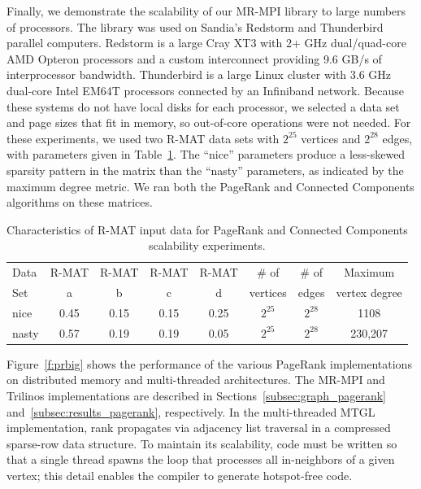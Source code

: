 Finally, we demonstrate the scalability of our MR-MPI library to large
numbers of processors.  The library was used on Sandia's Redstorm and
Thunderbird parallel computers.  Redstorm is a large Cray XT3 with 2+
{GHz} dual/quad-core AMD Opteron processors and a custom interconnect
providing 9.6 GB/s of interprocessor bandwidth.  Thunderbird is a
large Linux cluster with 3.6 {GHz} dual-core Intel EM64T processors
connected by an Infiniband network.  Because these systems do not have
local disks for each processor, we selected a data set and page sizes
that fit in memory, so out-of-core operations were not needed.  For
these experiments, we used two R-MAT data sets with $2^{25}$ vertices
and $2^{28}$ edges, with parameters given in Table~\ref{t:rmat}.  The
``nice'' parameters produce a less-skewed sparsity pattern in the
matrix than the ``nasty'' parameters, as indicated by the maximum
degree metric.  We ran both the PageRank and Connected Components
algorithms on these matrices.

\begin{table}
\begin{center}
\begin{tabular}{|l|c|c|c|c|c|c|c|}
\hline
Data & R-MAT  & R-MAT  & R-MAT  & R-MAT  & \# of    & \# of & Maximum \\
Set  & a      & b      & c      & d      & vertices & edges & vertex degree\\
\hline
nice  & 0.45 & 0.15 & 0.15 & 0.25 & $2^{25}$ & $2^{28}$ & 1108 \\
nasty & 0.57 & 0.19 & 0.19 & 0.05 & $2^{25}$ & $2^{28}$ & 230,207\\
\hline
\end{tabular}
\caption{Characteristics of R-MAT input data for PageRank and Connected
Components scalability experiments.}
\label{t:rmat}
\end{center}
\end{table}

Figure~\ref{f:prbig} shows the performance of the various PageRank
implementations on distributed memory and multi-threaded
architectures.  The MR-MPI and Trilinos implementations are described
in Sections~\ref{subsec:graph_pagerank}
and~\ref{subsec:results_pagerank}, respectively.  In the
multi-threaded MTGL implementation, rank propagates via adjacency list
traversal in a compressed sparse-row data structure.  To maintain its
scalability, code must be written so that a single thread spawns the
loop that processes all in-neighbors of a given vertex; this detail
enables the compiler to generate hotspot-free code.

